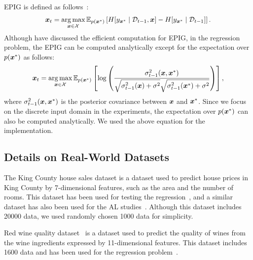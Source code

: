 EPIG is defined as follows~\citep{bickford2023-prediction}:
\begin{align*}
    \boldsymbol{x}_t = \operatorname*{arg\,max}_{\boldsymbol{x} \in {\cal X}} \mathbb{E}_{p(\boldsymbol{x}^*)}\left[ H[ y_{\boldsymbol{x}^*} \mid {\cal D}_{t-1}, \boldsymbol{x}] - H[ y_{\boldsymbol{x}^*} \mid {\cal D}_{t-1}] \right].
\end{align*}
%
Although \citet{bickford2023-prediction} have discussed the efficient computation for EPIG, in the regression problem, the EPIG can be computed analytically except for the expectation over $p(\boldsymbol{x}^*)$ as follows:
\begin{align*}
    \boldsymbol{x}_t = \operatorname*{arg\,max}_{\boldsymbol{x} \in {\cal X}} \mathbb{E}_{p(\boldsymbol{x}^*)}\left[ \log \left( \frac{\sigma_{t-1}^2(\boldsymbol{x}, \boldsymbol{x}^*) }{ \sqrt{\sigma_{t-1}^2(\boldsymbol{x}) + \sigma^2} \sqrt{\sigma_{t-1}^2(\boldsymbol{x}^*) + \sigma^2} } \right) \right],
\end{align*}
where $\sigma_{t-1}^2(\boldsymbol{x}, \boldsymbol{x}^*)$ is the posterior covariance between $\boldsymbol{x}$ and $\boldsymbol{x}^*$.
%
Since we focus on the discrete input domain in the experiments, the expectation over $p(\boldsymbol{x}^*)$ can also be computed analytically.
%
We used the above equation for the implementation.


\subsection{Details on Real-World Datasets}
\label{sec:datasets_detail}

The King County house sales dataset is a dataset used to predict house prices in King County by 7-dimensional features, such as the area and the number of rooms. 
%
This dataset has been used for testing the regression~\citep{park2020additive}, and a similar dataset has also been used for the AL studies~\citep{park2020robust}.
%
Although this dataset includes 20000 data, we used randomly chosen 1000 data for simplicity.


%
%


Red wine quality dataset~\citep{wine_quality_186} is a dataset used to predict the quality of wines from the wine ingredients expressed by 11-dimensional features.
%
This dataset includes 1600 data and has been used for the regression problem~\citep{cortez2009using}.




